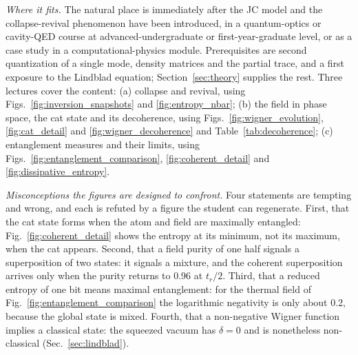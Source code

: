 \documentclass{iopjournal}
\begin{document}
\textit{Where it fits.} The natural place is immediately after the JC model and the collapse-revival phenomenon have been introduced, in a quantum-optics or cavity-QED course at advanced-undergraduate or first-year-graduate level, or as a case study in a computational-physics module. Prerequisites are second quantization of a single mode, density matrices and the partial trace, and a first exposure to the Lindblad equation; Section~\ref{sec:theory} supplies the rest. Three lectures cover the content: (a) collapse and revival, using Figs.~\ref{fig:inversion_snapshots} and \ref{fig:entropy_nbar}; (b) the field in phase space, the cat state and its decoherence, using Figs.~\ref{fig:wigner_evolution}, \ref{fig:cat_detail} and \ref{fig:wigner_decoherence} and Table~\ref{tab:decoherence}; (c) entanglement measures and their limits, using Figs.~\ref{fig:entanglement_comparison}, \ref{fig:coherent_detail} and \ref{fig:dissipative_entropy}.

\textit{Misconceptions the figures are designed to confront.} Four statements are tempting and wrong, and each is refuted by a figure the student can regenerate. First, that the cat state forms when the atom and field are maximally entangled: Fig.~\ref{fig:coherent_detail} shows the entropy at its minimum, not its maximum, when the cat appears. Second, that a field purity of one half signals a superposition of two states: it signals a mixture, and the coherent superposition arrives only when the purity returns to 0.96 at $t_r/2$. Third, that a reduced entropy of one bit means maximal entanglement: for the thermal field of Fig.~\ref{fig:entanglement_comparison} the logarithmic negativity is only about 0.2, because the global state is mixed. Fourth, that a non-negative Wigner function implies a classical state: the squeezed vacuum has $\delta = 0$ and is nonetheless non-classical (Sec.~\ref{sec:lindblad}).
\end{document}
